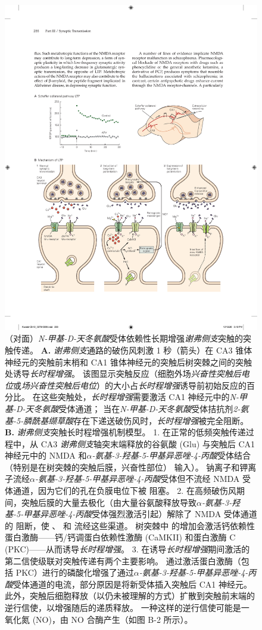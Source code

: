 \begin{figure}[htbp]
	\centering
	\includegraphics[width=0.85\linewidth]{chap13/fig_13_10}
	\caption{（对面）\textit{N-甲基-D-天冬氨酸}受体依赖性长期增强\textit{谢弗侧支}突触的突触传递。
		\textbf{A.} \textit{谢弗侧支}通路的破伤风刺激 1 秒（箭头）在 CA3 锥体神经元的突触前末梢和 CA1 锥体神经元的突触后树突棘之间的突触处诱导\textit{长时程增强}。
		该图显示突触反应（细胞外场\textit{兴奋性突触后电位}或\textit{场兴奋性突触后电位}）的大小占\textit{长时程增强}诱导前初始反应的百分比。
		在这些突触处，\textit{长时程增强}需要激活 CA1 神经元中的\textit{N-甲基-D-天冬氨酸}受体通道； 
		当在\textit{N-甲基-D-天冬氨酸}受体拮抗剂\textit{2-氨基-5-膦酰基缬草酸}存在下递送破伤风时，\textit{长时程增强}被完全阻断\cite{morgan2001electrical}。
		\textbf{B.} \textit{谢弗侧支}突触长时程增强机制模型。
		1. 在正常的低频突触传递过程中，从 CA3 \textit{谢弗侧支}轴突末端释放的谷氨酸 (Glu) 与突触后 CA1 神经元中的 NMDA 和\textit{$\alpha$-氨基-3-羟基-5-甲基异恶唑-4-丙酸}受体结合（特别是在树突棘的突触后膜，兴奋性部位） 输入）。
		钠离子和钾离子流经\textit{$\alpha$-氨基-3-羟基-5-甲基异恶唑-4-丙酸}受体但不流经 NMDA 受体通道，因为它们的孔在负膜电位下被  阻塞。
		2. 在高频破伤风期间，突触后膜的大量去极化（由大量谷氨酸释放导致\textit{$\alpha$-氨基-3-羟基-5-甲基异恶唑-4-丙酸}受体强烈激活引起）解除了 NMDA 受体通道的  阻断，使 、 和  流经这些渠道。
		树突棘中  的增加会激活钙依赖性蛋白激酶——钙/钙调蛋白依赖性激酶 (CaMKII) 和蛋白激酶 C (PKC)——从而诱导\textit{长时程增强}。
		3. 在诱导\textit{长时程增强}期间激活的第二信使级联对突触传递有两个主要影响。
		通过激活蛋白激酶（包括 PKC）进行的磷酸化增强了通过\textit{$\alpha$-氨基-3-羟基-5-甲基异恶唑-4-丙酸}受体通道的电流，部分原因是将新受体插入突触后 CA1 神经元。
		此外，突触后细胞释放（以仍未被理解的方式）扩散到突触前末端的逆行信使，以增强随后的递质释放。
		一种这样的逆行信使可能是一氧化氮 (NO)，由 NO 合酶产生（如图 B-2 所示）。}
	\label{fig:13_10}
\end{figure}


